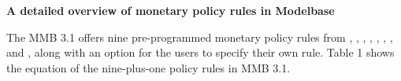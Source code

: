\documentclass[11pt,a4paper]{article}
\begin{document}

\begin{center}
{\Large \textbf{A detailed overview of monetary policy rules in Modelbase} }
\par\end{center}

\fontsize{11}{18pt}\selectfont



\noindent The MMB 3.1 offers nine pre-programmed monetary policy rules from \cite{Taylor1993}, \cite{GerdesmeierRoffia2004},
\cite{LevinWielandWilliams2003}, \cite{SmetsWouters2007}, \cite{ChristianoEichenbaumEvans2005}, \cite{OrphanidesWieland2008}, \cite{OrphanidesWieland2013}, \cite{CMR2014} and \cite{Coenenetal2012}, along with an option for the users to specify their own rule. Table 1 shows the equation of the nine-plus-one policy rules in MMB 3.1. %
\end{document}
